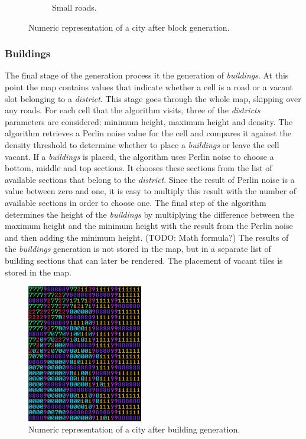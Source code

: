 \begin{figure}[h]
\begin{subfigure}{0.5\textwidth}
				\caption{Small roads.}
				\label{fig:map-small-roads}
			\end{subfigure}
			\caption{Numeric representation of a city after block generation.}
			\label{fig:map-main-and-small-roads}
		\end{figure}
		
		\subsubsection{Buildings}
		The final stage of the generation process it the generation of \textit{buildings}. At this point the map contains values that indicate whether a cell is a road or a vacant slot belonging to a \textit{district}. This stage goes through the whole map, skipping over any roads. For each cell that the algorithm visits, three of the \textit{districts} parameters are considered: minimum height, maximum height and density. The algorithm retrieves a Perlin noise value for the cell and compares it against the density threshold to determine whether to place a \textit{buildings} or leave the cell vacant. If a \textit{buildings} is placed, the algorithm uses Perlin noise to choose a bottom, middle and top sections. It chooses these sections from the list of available sections that belong to the \textit{district}. Since the result of Perlin noise is a value between zero and one, it is easy to multiply this result with the number of available sections in order to choose one. The final step of the algorithm determines the height of the \textit{buildings} by multiplying the difference between the maximum height and the minimum height with the result from the Perlin noise and then adding the minimum height. (TODO: Math formula?) The results of the \textit{buildings} generation is not stored in the map, but in a separate list of building sections that can later be rendered. The placement of vacant tiles is stored in the map.
		
		\begin{figure}
			\centering
			\includegraphics[width=0.45\textwidth]{"Images/map grass colored"}
			\caption{Numeric representation of a city after building generation.}
			\label{fig:map-grass}
		\end{figure}

